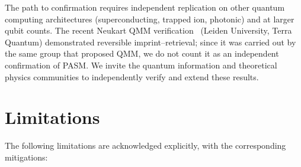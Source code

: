 \documentclass[12pt,a4paper]{article}
\begin{document}
The path to confirmation requires independent replication on other quantum computing architectures (superconducting, trapped ion, photonic) and at larger qubit counts. The recent Neukart QMM verification~\cite{neukart2026qip} (Leiden University, Terra Quantum) demonstrated reversible imprint--retrieval; since it was carried out by the same group that proposed QMM, we do not count it as an independent confirmation of PASM. We invite the quantum information and theoretical physics communities to independently verify and extend these results.

\section*{Limitations}

The following limitations are acknowledged explicitly, with the corresponding mitigations:
\end{document}
